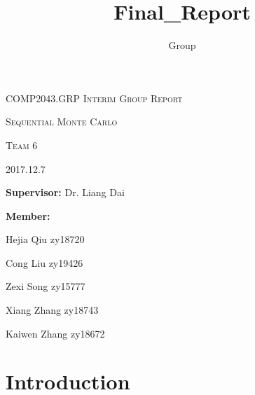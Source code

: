 \documentclass[11pt,oneside,a4paper]{article}
\author{Group}
\title{Final_Report}
\begin{document}
\begin{titlepage}
\begin{center}
{\large \textsc{COMP2043.GRP Interim Group Report}}

\vspace{0.025\textheight} %
{\huge \textsc{Sequential Monte Carlo}} %

\vspace{0.045\textheight}
{\huge\textsc{Team 6}}
\vspace{0.05\textheight}

{\huge\textsc{ 2017.12.7}}
\vspace{0.45\textheight}


\textbf{Supervisor:} Dr. Liang Dai
\vspace{0.045\textheight}

\textbf{Member:}
\begin{spacing}{2.0}%
          Hejia Qiu zy18720

          Cong Liu zy19426

          Zexi Song zy15777

          Xiang Zhang zy18743

          Kaiwen Zhang zy18672
\end{spacing}
  	\vspace{0.025\textheight}
\end{center}
\end{titlepage}
\tableofcontents
\newpage
\section{Introduction}
\end{document}
